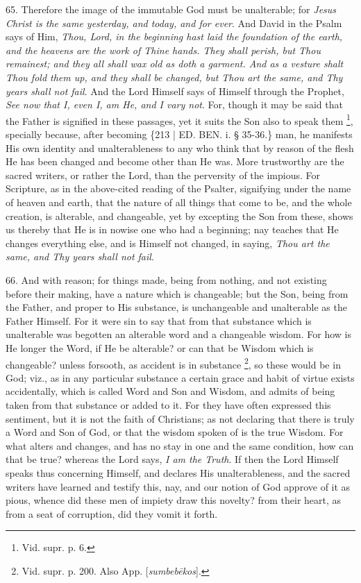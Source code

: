 65. Therefore the image of the
immutable God must be unalterable; for \emph{Jesus Christ is the same
yesterday, and today, and for ever}. And David in the Psalm says of
Him, \emph{Thou, Lord, in the beginning hast laid the foundation of the
earth, and the heavens are the work of Thine hands. They shall perish,
but Thou remainest; and they all shall wax old as doth a garment. And
as a vesture shalt Thou fold them up, and they shall be changed, but
Thou art the same, and Thy years shall not fail}. And the Lord
Himself says of Himself through the Prophet, \emph{See now that I, even
I, am He, and I vary not}. For, though it may be said that the
Father is signified in these passages, yet it suits the Son also to
speak them \footnote{Vid. supr. p. 6.}, specially
because, after becoming \{213 | ED. BEN.
i. § 35-36.\} man, he manifests His own identity and unalterableness
to any who think that by reason of the flesh He has been changed and
become other than He was. More trustworthy are the sacred writers, or
rather the Lord, than the perversity of the impious. For Scripture, as
in the above-cited reading of the Psalter, signifying under the name
of heaven and earth, that the nature of all things that come to be,
and the whole creation, is alterable, and changeable, yet by excepting
the Son from these, shows us thereby that He is in nowise one who had
a beginning; nay teaches that He changes everything else, and is
Himself not changed, in saying, \emph{Thou art the same, and Thy years
shall not fail}.

66. And with reason; for
things made, being from nothing, and not existing before their making,
have a nature which is changeable; but the Son, being from the Father,
and proper to His substance, is unchangeable and unalterable as the
Father Himself. For it were sin to say that from that substance which
is unalterable was begotten an alterable word and a changeable wisdom.
For how is He longer the Word, if He be alterable? or can that be
Wisdom which is changeable? unless forsooth, as accident is in
substance \footnote{Vid. supr. p. 200. Also App. [\emph{sumbeb\={e}kos}].}, so these
would be in God; viz., as in any particular substance a certain grace
and habit of virtue exists accidentally, which is called Word and Son
and Wisdom, and admits of being taken from that substance or added to
it. For they have often expressed this sentiment, but it is not the
faith of Christians; as not declaring that there is truly a Word and
Son of God, or that the wisdom spoken of is the true Wisdom. For what
alters and changes, and has no stay in one and the same condition, how
can that be true? whereas the Lord says, \emph{I am the Truth}. If
then the Lord Himself speaks thus concerning Himself, and declares His
unalterableness, and the sacred writers have learned and testify
this, nay, and our notion of God approve of it as pious, whence did
these men of impiety draw this novelty? from their heart, as from a
seat of corruption, did they vomit it forth.


